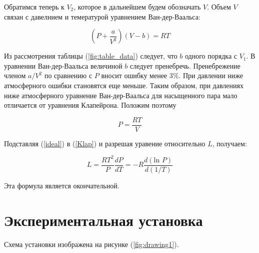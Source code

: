 \documentclass[a4paper,12pt]{article} %
\begin{document}
Обратимся теперь к $V_2$, которое в дальнейшем будем обозначать $V$. Объем $V$ связан с давелнием и темературой уравнением Ван-дер-Ваальса:

\begin{equation}
    \label{Van-der}
    \left( P + \frac{a}{V^2}\right)(V - b) = RT
\end{equation}

Из рассмотрения таблицы (\ref{fig:table_data}) следует, что $b$ одного порядка с $V_1$. В уравнении Ван-дер-Ваальса величиной $b$ следует пренебречь. Пренебрежение членом $a/V^2$ по сравнению с $P$ вносит ошибку менее 3\%. При давлении ниже атмосферного ошибки становятся еще меньше. Таким образом, при давлениях ниже атмосферного уравнение Ван-дер-Ваальса для насыщенного пара мало отличается от уравнения Клапейрона. Положим поэтому

\begin{equation}
    \label{ideal}
    P = \frac{RT}{V}
\end{equation}

Подставляя (\ref{ideal}) в (\ref{Klap}) и разрешая уравение относительно $L$, получаем:

\begin{equation}
    \label{L}
    L = \frac{RT^2}{P}\frac{dP}{dT} = -R\frac{d(\mbox{ln }P)}{d(1/T)}
\end{equation}

Эта формула является окончательной.

\section{Экспериментальная установка}

Схема установки изображена на рисунке (\ref{fig:drawing1}). 
\end{document}
